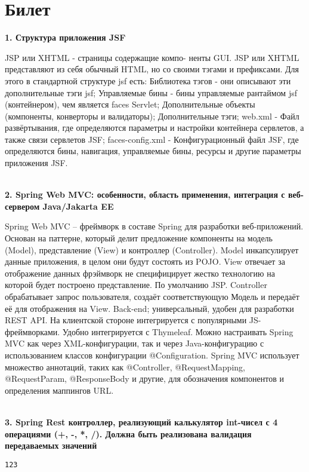 \documentclass{article}
\newcommand{\bil}[5]{%
        \section{Билет}
        \textbf{1. #1}

        #4
        \\
        \textbf{2. #2}
        
        #5
        \\
        \textbf{3. #3}
}
\begin{document}
\bil{Структура приложения JSF}
{Spring Web MVC: особенности, область применения, интеграция с веб-сервером Java/Jakarta EE}
{Spring Rest контроллер, реализующий калькулятор int-чисел с 4 операциями (+, -, *, /). Должна быть реализована валидация передаваемых значений}{
    JSP или XHTML - страницы содержащие компо- ненты GUI. 
    JSP или XHTML представляют из себя обычный HTML, но со своими тэгами и префиксами. 
    Для этого в стандартной структуре jsf есть: Библиотека тэгов - они описывают эти дополнительные тэги jsf; 
    Управляемые бины - бины управляемые рантаймом jsf (контейнером), чем является faces Servlet; 
    Дополнительные объекты (компоненты, конверторы и валидаторы); 
    Дополнительные тэги; web.xml - Файл развёртывания, где определяются параметры и настройки контейнера сервлетов, а также связи сервлетов JSF; 
    faces-config.xml - Конфигурационный файл JSF, где определяются бины, навигация, управляемые бины, ресурсы и другие параметры приложения JSF.
}{
    Spring Web MVC – фреймворк в составе Spring для разработки веб-приложений. 
    Основан на паттерне, который делит предложение компоненты на модель (Model), представление (View) и контроллер (Controller). 
    Model инкапсулирует данные приложения, в целом они будут состоять из POJO. 
    View отвечает за отображение данных фрэймворк не специфицирует жестко технологию на которой будет построено представление. 
    По умолчанию JSP. Controller обрабатывает запрос пользователя, создаёт соответствующую Модель и передаёт её для отображения на View. 
    Back-end; универсальный, удобен для разработки REST API. На клиентской стороне интегрируется с популярными JS-фреймворками. 
    Удобно интегрируется с Thymeleaf. Можно настраивать Spring MVC как через XML-конфигурации, так и через Java-конфигурацию с использованием классов конфигурации @Configuration. 
    Spring MVC использует множество аннотаций, таких как @Controller, @RequestMapping, @RequestParam, @ResponseBody и другие, для обозначения компонентов и определения маппингов URL.
}
\begin{lstlisting}[frame=single, basicstyle=\ttfamily, breaklines=true, breakatwhitespace=true, postbreak=\mbox{\textcolor{red}{$\hookrightarrow$}\space}]
123
\end{lstlisting}
\end{document}
